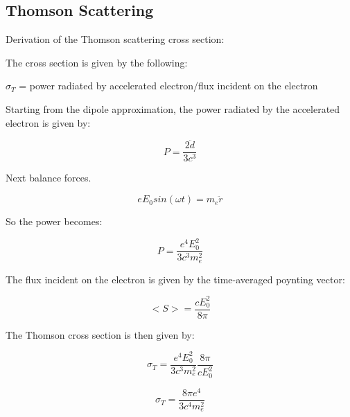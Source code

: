 \subsection{Thomson Scattering}

Derivation of the Thomson scattering cross section:

The cross section is given by the following:

$\sigma_T$ = power radiated by accelerated electron/flux incident on the electron

Starting from the dipole approximation, the power radiated by the accelerated electron is given by:

\begin{equation}
P = \frac{2\ddot d}{3c^3}
\end{equation}

Next balance forces. 

\begin{equation}
eE_0sin(\omega t) = m_e\ddot r
\end{equation}

So the power becomes:

\begin{equation}
P = \frac{e^4E_0^2}{3c^3m_e^2}
\end{equation}

The flux incident on the electron is given by the time-averaged poynting vector:

\begin{equation}
<S> = \frac{cE_0^2}{8\pi}
\end{equation}

The Thomson cross section is then given by:

\begin{equation}
\sigma_T = \frac{e^4E_0^2}{3c^3m_e^2}\frac{8\pi}{cE_0^2}
\end{equation}

\begin{equation}
\sigma_T = \frac{8\pi e^4}{3c^4m_e^2}
\end{equation}

